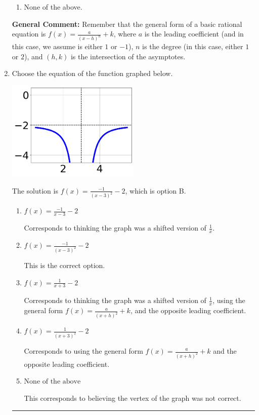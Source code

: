 \documentclass{extbook}[14pt]
\newcommand{\litem}[1]{\item #1

\rule{\textwidth}{0.4pt}}
\begin{document}
\begin{enumerate}
{\begin{enumerate}[label=\Alph*.]
\begin{multicols}{2}
\end{multicols}\item None of the above.\end{enumerate}
\textbf{General Comment:} Remember that the general form of a basic rational equation is $ f(x) = \frac{a}{(x-h)^n} + k$, where $a$ is the leading coefficient (and in this case, we assume is either $1$ or $-1$), $n$ is the degree (in this case, either $1$ or $2$), and $(h, k)$ is the intersection of the asymptotes.
}
\litem{
Choose the equation of the function graphed below.

\begin{center}
    \includegraphics[width=0.5\textwidth]{../Figures/rationalGraphToEquationCopyC.png}
\end{center}


The solution is \( f(x) = \frac{-1}{(x - 3)^2} - 2 \), which is option B.\begin{enumerate}[label=\Alph*.]
\item \( f(x) = \frac{-1}{x - 3} - 2 \)

Corresponds to thinking the graph was a shifted version of $\frac{1}{x}$.
\item \( f(x) = \frac{-1}{(x - 3)^2} - 2 \)

This is the correct option.
\item \( f(x) = \frac{1}{x + 3} - 2 \)

Corresponds to thinking the graph was a shifted version of $\frac{1}{x}$, using the general form $f(x) = \frac{a}{(x+h)^2}+k$, and the opposite leading coefficient.
\item \( f(x) = \frac{1}{(x + 3)^2} - 2 \)

Corresponds to using the general form $f(x) = \frac{a}{(x+h)^2}+k$ and the opposite leading coefficient.
\item \( \text{None of the above} \)

This corresponds to believing the vertex of the graph was not correct.
\end{enumerate}

}
\end{enumerate}
\end{document}
